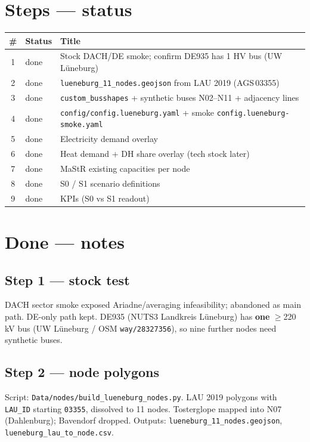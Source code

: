 \documentclass[11pt,a4paper]{article}
\begin{document}
\section{Steps --- status}

\begin{center}
\begin{tabular}{@{}clp{8cm}@{}}
\toprule
\# & Status & Title \\
\midrule
1 & done & Stock DACH/DE smoke; confirm DE935 has 1 HV bus (UW Lüneburg) \\
2 & done & \texttt{lueneburg\_11\_nodes.geojson} from LAU 2019 (AGS\,03355) \\
3 & done & \texttt{custom\_busshapes} + synthetic buses N02--N11 + adjacency lines \\
4 & done & \texttt{config/config.lueneburg.yaml} + smoke \texttt{config.lueneburg-smoke.yaml} \\
5 & done & Electricity demand overlay \\
6 & done & Heat demand + DH share overlay (tech stock later) \\
7 & done & MaStR existing capacities per node \\
8 & done & S0 / S1 scenario definitions \\
9 & done & KPIs (S0 vs S1 readout) \\
\bottomrule
\end{tabular}
\end{center}

\section{Done --- notes}

\subsection{Step 1 --- stock test}
DACH sector smoke exposed Ariadne/averaging infeasibility; abandoned as main path.
DE-only path kept. DE935 (NUTS3 Landkreis Lüneburg) has \textbf{one} $\ge$220\,kV bus
(UW Lüneburg / OSM \texttt{way/28327356}), so nine further nodes need synthetic buses.

\subsection{Step 2 --- node polygons}
Script: \texttt{Data/nodes/build\_lueneburg\_nodes.py}.
LAU 2019 polygons with \texttt{LAU\_ID} starting \texttt{03355}, dissolved to 11 nodes.
Tosterglope mapped into N07 (Dahlenburg); Bavendorf dropped.
Outputs: \texttt{lueneburg\_11\_nodes.geojson}, \texttt{lueneburg\_lau\_to\_node.csv}.
\end{document}
